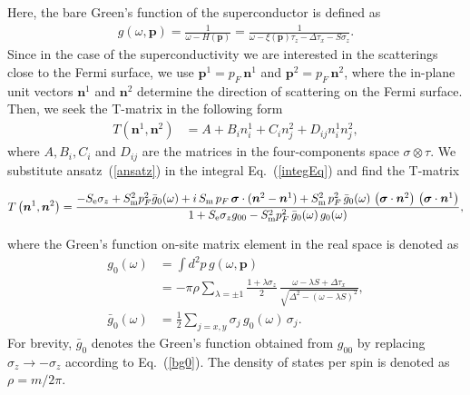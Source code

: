 \documentclass[twocolumn,showpacs,floatfix,nofootinbib,longbibliography]{revtex4-1}
\begin{document}
Here, the bare Green's function of the superconductor is defined as 
\begin{align}
	g(\omega,\bm p) = \frac{1}{\omega-H(\bm p)} = \frac{1}{\omega-\xi(\bm p)\tau_z-\Delta \tau_x - S\sigma_z}.
\end{align}
Since in the case of the superconductivity we are interested in the scatterings close to the Fermi surface, we use $\bm p^{1} = p_F\, \bm n^{1}$ and $\bm p^{2} = p_F \,\bm n^{2}$, where the in-plane unit vectors $\bm n^{1}$ and $\bm n^{2}$ determine the direction of scattering on the Fermi surface.  Then, we seek the T-matrix in the following form
\begin{align}
	T\left(\bm n^{1},\bm n^{2}\right) &= A + B_i n^{1}_i + C_i n^{2}_j + D_{ij} n^{1}_i n^{2}_j, \label{ansatz}
\end{align}
where  $A,B_i,C_i$ and $D_{ij}$ are the matrices in the four-components space $\sigma\otimes\tau$. We substitute ansatz~(\ref{ansatz}) in the integral Eq.~(\ref{integEq}) and find the T-matrix
\begin{widetext}
\begin{equation}
	T\left(\bm n^{1},\bm n^{2}\right) = \frac{-S_{\rm e}\sigma_z+S^2_{\rm m}p_F^2\bar g_{0}(\omega)+i\,S_{\rm m}\,p_F \,  \bm \sigma\cdot(\bm n^{2}- \bm n^{1}) +S^2_{\rm m}\, p^2_F \, \bar g_{0}(\omega)\,\left(\bm \sigma\cdot\bm n^{2}\right)\,\left(\bm \sigma\cdot \bm n^{1}\right)}{1+S_{\rm e}\sigma_zg_{00}-S^2_{\rm m}p_F^2\,\bar g_{0}(\omega)\, g_{0}(\omega)},
\end{equation}
\end{widetext}
where the Green's function on-site matrix element in the real space is denoted as 
\begin{align}
	g_{0}(\omega) &   =\int d^2 p\, g(\omega,\bm p)  	\label{g0} \\
	 & =-\pi\rho\sum_{\lambda = \pm 1} \frac{1+\lambda\sigma_z}{2}\,\frac{\omega-\lambda S+\Delta\tau_x}{\sqrt{\Delta^2-\left( \omega-\lambda S \right)^2}}, \nonumber \\
	 \bar g_{0}(\omega) & = \frac{1}{2} \sum_{j=x,y}\sigma_j\, g_{0}(\omega)\, \sigma_j.\label{bg0}
\end{align}
For brevity, $\bar g_{0}$ denotes the Green's function obtained from $g_{00}$ by replacing $\sigma_z \rightarrow - \sigma_z$ according to Eq.~(\ref{bg0}). The density of states per spin is denoted as $\rho = m/2\pi$.
\end{document}
